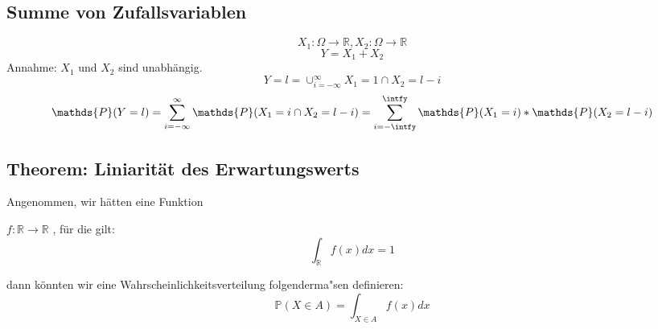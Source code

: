 \documentclass{article}
\begin{document}
\vspace{10pt}

\subsection *{Summe von Zufallsvariablen}

\vspace{5pt}
\begin{equation*}
X_{1}:\Omega \longrightarrow \mathds{R}, X_{2}:\Omega \longrightarrow \mathds{R}
\end{equation*}
\begin{equation*}
Y=X_{1}+X_{2}
\end{equation*}
\vspace{3pt}
Annahme: $X_{1}$ und $X_{2}$ sind unabh\"angig.\\
\begin{equation*}
{Y=l}=\cup_{i=-\infty}^{\infty} {X_{1}=1} \cap {X_{2}=l-i}
\end{equation*}
\vspace{3pt}
\begin{equation*}
\mathds{P} ({Y=l}) = \sum_{i=-\infty}^{\infty} \mathds{P} ({X_{1}=i} \cap {X_{2}=l-i}) = \sum_{i=-\intfy}^{\intfy} \mathds{P} ({X_{1} = i}) * \mathds{P} ({X_{2}=l-i})
\end{equation*}

\vspace{10pt}

\subsection *{Theorem: Liniarit\"at des Erwartungswerts}

\vspace{5pt}

Angenommen, wir h\"atten eine Funktion
\vspace{3pt}

$f: \mathds{R} \longrightarrow \mathds{R}$ , f\"ur die gilt: 
\begin{equation*}
\int_{\mathds{R}} f(x) dx = 1
\end{equation*}

\vspace{3pt}

dann k\"onnten wir eine Wahrscheinlichkeitsverteilung folgenderma"sen definieren:
\begin{equation*}
\mathds{P} ({X\in A}) = \int_{X \in A} f(x) dx
\end{equation*}
\end{document}
